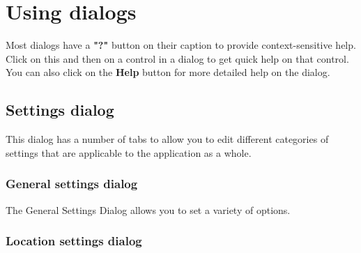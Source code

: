 \chapter{Using dialogs}\label{dialogs}%
%
\setfooter{\thepage}{}{}{}{}{\thepage}%

Most dialogs have a {\bf "?"} button on their caption to provide context-sensitive help.
Click on this and then on a control
in a dialog to get quick help on that control. You can also click on the {\bf Help} button
for more detailed help on the dialog.

\section{Settings dialog}\label{settingsdialog}

This dialog has a number of tabs to allow you to
edit different categories of settings that are applicable
to the application as a whole.

\subsection{General settings dialog}\label{generalapplicationsettingsdialog}

The General Settings Dialog allows you to set a variety of \ctshortname options.

\twocolwidtha{5cm}
\begin{twocollist}\itemsep=0pt
\end{twocollist}

\subsection{Location settings dialog}\label{locationsettingsdialog}

